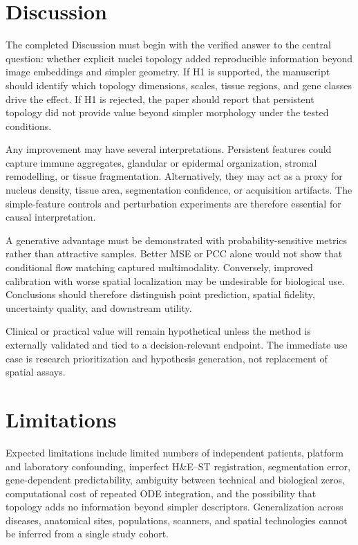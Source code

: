 \documentclass[nocrop]{bioinfo}
\begin{document}
\section{Discussion}

The completed Discussion must begin with the verified answer to the central
question: whether explicit nuclei topology added reproducible information
beyond image embeddings and simpler geometry. If H1 is supported, the
manuscript should identify which topology dimensions, scales, tissue regions,
and gene classes drive the effect. If H1 is rejected, the paper should report
that persistent topology did not provide value beyond simpler morphology
under the tested conditions.

Any improvement may have several interpretations. Persistent features could
capture immune aggregates, glandular or epidermal organization, stromal
remodelling, or tissue fragmentation. Alternatively, they may act as a proxy
for nucleus density, tissue area, segmentation confidence, or acquisition
artifacts. The simple-feature controls and perturbation experiments are
therefore essential for causal interpretation.

A generative advantage must be demonstrated with probability-sensitive
metrics rather than attractive samples. Better MSE or PCC alone would not
show that conditional flow matching captured multimodality. Conversely,
improved calibration with worse spatial localization may be undesirable for
biological use. Conclusions should therefore distinguish point prediction,
spatial fidelity, uncertainty quality, and downstream utility.

Clinical or practical value will remain hypothetical unless the method is
externally validated and tied to a decision-relevant endpoint. The immediate
use case is research prioritization and hypothesis generation, not
replacement of spatial assays.

\section{Limitations}

Expected limitations include limited numbers of independent patients,
platform and laboratory confounding, imperfect H\&E--ST registration,
segmentation error, gene-dependent predictability, ambiguity between
technical and biological zeros, computational cost of repeated ODE
integration, and the possibility that topology adds no information beyond
simpler descriptors. Generalization across diseases, anatomical sites,
populations, scanners, and spatial technologies cannot be inferred from a
single study cohort.
\end{document}
